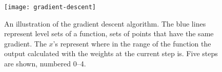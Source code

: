 \begin{figure}[ht]
  \centering
  \texttt{[image: gradient-descent]}
  \caption[An illustration of gradient descent.]{An illustration of the gradient
    descent algorithm. The blue lines represent level sets of a function, sets
    of points that have the same gradient. The $x$'s represent where in the
    range of the function the output calculated with the weights at the
    current step is. Five steps are shown, numbered 0--4.}
  \label{fig:grad-desc}
\end{figure}
  